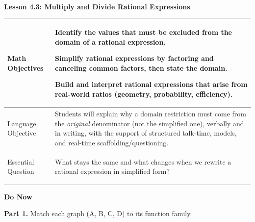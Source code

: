 \documentclass[11pt]{article}
\begin{document}
\begin{center}
{\Large\bfseries Lesson 4.3: Multiply and Divide Rational Expressions}
\end{center}

\vspace{0.3em}

\noindent
\begin{tabularx}{\linewidth}{|>{\bfseries\raggedright\arraybackslash}p{1.55in}|X|}
  \hline
  Math Objectives &
    Identify the values that must be excluded from the domain of a
    rational expression. \par
    Simplify rational expressions by factoring and canceling common
    factors, then state the domain. \par
    Build and interpret rational expressions that arise from real-world
    ratios (geometry, probability, efficiency). \\ \hline
  Language Objective &
    Students will explain why a domain restriction must come from the
    \emph{original} denominator (not the simplified one), verbally and
    in writing, with the support of structured talk-time, models, and
    real-time scaffolding/questioning. \\ \hline
  Essential Question &
    What stays the same and what changes when we rewrite a rational
    expression in simplified form? \\ \hline
\end{tabularx}

\vspace{1em}

\textbf{Do Now}

\vspace{0.2em}
\textbf{Part 1.}\; Match each graph (A, B, C, D) to its function family.
\end{document}
